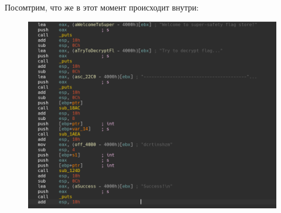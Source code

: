 \documentclass[idxtotoc,hyperref,openany,oneside]{files/reverse} %
\begin{document}
Посомтрим, что же в этот момент происходит внутри:
\begin{figure}[H]
\begin{center}
\includegraphics[width=1.0\linewidth]{files/enigma-asm}
\end{center}
\label{fig:enigma-asm}
\end{figure}
\end{document}
